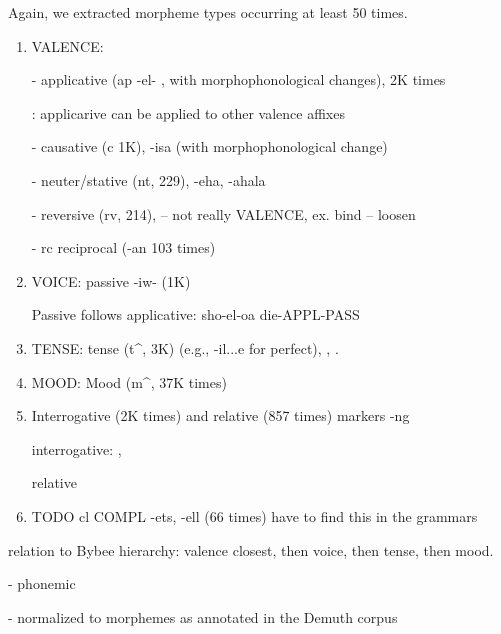 Again, we extracted morpheme types occurring at least 50 times.

\begin{enumerate}
    \item VALENCE:
    
    - applicative
    (ap -el- \cite[]{doke1967textbook} \cite[p. 109]{lombard1969handbook}, with morphophonological changes), 2K times
    
    \cite[-315]{doke1967textbook}: applicarive can be applied to other valence affixes
    
    - causative (c 1K), -isa (with morphophonological change) \cite[]{doke1967textbook}
    
    - neuter/stative (nt, 229), -eha, -ahala \cite[]{doke1967textbook}
    
    - reversive (rv, 214),  \cite[]{doke1967textbook} -- not really VALENCE, ex. bind -- loosen
    
    - rc reciprocal (-an 103 times)  \cite[]{doke1967textbook}
    
    \item VOICE: passive -iw- (1K)
    
    \cite[]{doke1967textbook} \cite[p. 114]{lombard1969handbook}
    
    Passive follows applicative: sho-el-oa die-APPL-PASS \cite[]{doke1967textbook}
    \item TENSE: tense (t\^{}, 3K) (e.g., -il...e for perfect), \cite[p. 167]{guma1971outline}, \cite[p. 116]{lombard1969handbook}.
    \item MOOD: Mood (m\^{}, 37K times)
    \item Interrogative (2K times) and relative (857 times) markers -ng
    
    interrogative: \cite[p. 168]{guma1971handbook}, \cite[, 320]{doke1967textbook}
    
    relative \cite[, 793]{doke1967textbook}
    
    \item     TODO cl COMPL -ets, -ell (66 times) have to find this in the grammars
\end{enumerate}

relation to Bybee hierarchy: valence closest, then voice, then tense, then mood.

- phonemic

- normalized to morphemes as annotated in the Demuth corpus

